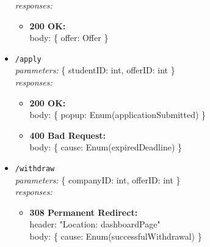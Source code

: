 \begin{itemize}
        \textit{responses:}
        \begin{itemize}
            \item \textbf{200 OK:} \\
            body: \{ offer: Offer \}
        \end{itemize}
    \item \texttt{/apply} \\
        \textit{parameters:} \{ studentID: int, offerID: int \} \\
        \textit{responses:}
        \begin{itemize}
            \item \textbf{200 OK:} \\
            body: \{ popup: Enum(applicationSubmitted) \}
            \item \textbf{400 Bad Request:} \\
            body: \{ cause: Enum(expiredDeadline) \}
        \end{itemize}
    \item \texttt{/withdraw} \\
        \textit{parameters:} \{ companyID: int, offerID: int \} \\
        \textit{responses:}
        \begin{itemize}
            \item \textbf{308 Permanent Redirect:} \\
            header: "Location: dashboardPage" \\
            body: \{ cause: Enum(successfulWithdrawal) \}
        \end{itemize}
\end{itemize}

